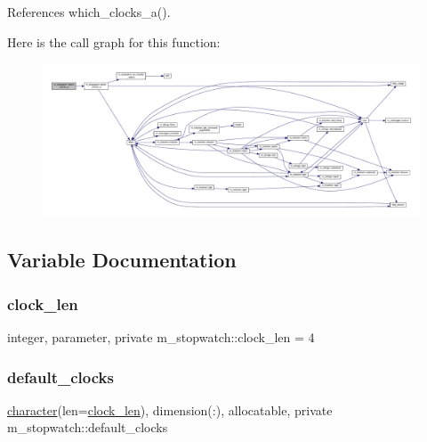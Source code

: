 References which\+\_\+clocks\+\_\+a().

Here is the call graph for this function\+:
\nopagebreak
\begin{figure}[H]
\begin{center}
\leavevmode
\includegraphics[width=350pt]{namespacem__stopwatch_a2438913aaa1966dfa18811ff048d642b_cgraph}
\end{center}
\end{figure}


\subsection{Variable Documentation}
\mbox{\label{namespacem__stopwatch_aa5f2b7700fd32f070e22af9950c47805}} 
\subsubsection{\texorpdfstring{clock\+\_\+len}{clock\_len}}
{\footnotesize\ttfamily integer, parameter, private m\+\_\+stopwatch\+::clock\+\_\+len = 4\hspace{0.3cm}{\ttfamily [private]}}

\mbox{\label{namespacem__stopwatch_a779dc9ad87f18ac158e8ac6cb47601e4}} 
\subsubsection{\texorpdfstring{default\+\_\+clocks}{default\_clocks}}
{\footnotesize\ttfamily \hyperlink{option__stopwatch_83_8txt_abd4b21fbbd175834027b5224bfe97e66}{character}(len=\hyperlink{namespacem__stopwatch_aa5f2b7700fd32f070e22af9950c47805}{clock\+\_\+len}), dimension(\+:), allocatable, private m\+\_\+stopwatch\+::default\+\_\+clocks\hspace{0.3cm}{\ttfamily [private]}}

